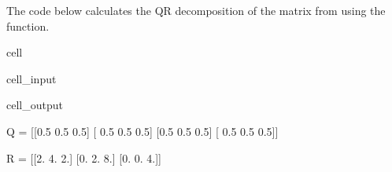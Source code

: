 \documentclass[letterpaper,10pt,english]{jupyterBook}
\begin{document}
\sphinxAtStartPar
The code below calculates the QR decomposition of the matrix from {\hyperref[\detokenize{6_Direct_methods/6.4_QR_decomposition:qr-gramschmidt-example}]{}} using the  function.

\begin{sphinxuseclass}{cell}\begin{sphinxVerbatimInput}

\begin{sphinxuseclass}{cell_input}
\begin{sphinxVerbatim}[commandchars=\\\{\}]
  \PYG{p}{[}\PYG{p}{[}  \PYG{p}{]} \PYG{p}{[}  \PYG{p}{]} \PYG{p}{[}  \PYG{p}{]} \PYG{p}{[}  \PYG{p}{]}\PYG{p}{]}

   

\end{sphinxVerbatim}

\end{sphinxuseclass}\end{sphinxVerbatimInput}
\begin{sphinxVerbatimOutput}

\begin{sphinxuseclass}{cell_output}
\begin{sphinxVerbatim}[commandchars=\\\{\}]
Q = 
[[\PYGZhy{}0.5  0.5 \PYGZhy{}0.5]
 [ 0.5  0.5 \PYGZhy{}0.5]
 [\PYGZhy{}0.5  0.5  0.5]
 [ 0.5  0.5  0.5]]

R = 
[[2. 4. 2.]
 [0. 2. 8.]
 [0. 0. 4.]]
\end{sphinxVerbatim}

\end{sphinxuseclass}\end{sphinxVerbatimOutput}

\end{sphinxuseclass}
\end{document}
